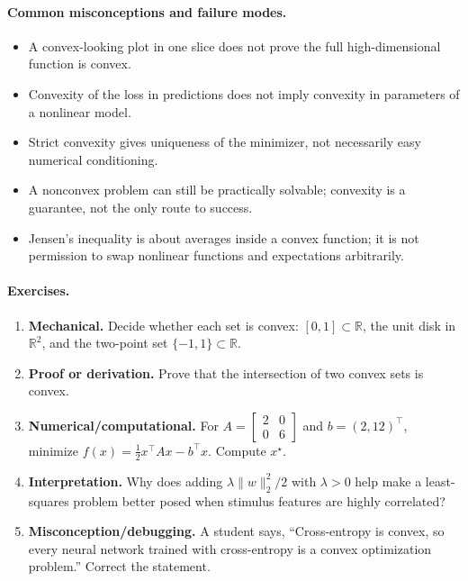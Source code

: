 \paragraph{Common misconceptions and failure modes.}
\begin{itemize}[leftmargin=*]
\item A convex-looking plot in one slice does not prove the full high-dimensional function is convex.
\item Convexity of the loss in predictions does not imply convexity in parameters of a nonlinear model.
\item Strict convexity gives uniqueness of the minimizer, not necessarily easy numerical conditioning.
\item A nonconvex problem can still be practically solvable; convexity is a guarantee, not the only route to success.
\item Jensen's inequality is about averages inside a convex function; it is not permission to swap nonlinear functions and expectations arbitrarily.
\end{itemize}

\paragraph{Exercises.}
\begin{enumerate}[label=\textbf{20.2.\arabic*.}, leftmargin=*]
\item \textbf{Mechanical.} Decide whether each set is convex: \([0,1]\subset\mathbb R\), the unit disk in \(\mathbb R^2\), and the two-point set \(\{-1,1\}\subset\mathbb R\).
\item \textbf{Proof or derivation.} Prove that the intersection of two convex sets is convex.
\item \textbf{Numerical/computational.} For \(A=\begin{bmatrix}2&0\\0&6\end{bmatrix}\) and \(b=(2,12)^\top\), minimize \(f(x)=\frac12x^\top Ax-b^\top x\). Compute \(x^\star\).
\item \textbf{Interpretation.} Why does adding \(\lambda\|w\|_2^2/2\) with \(\lambda>0\) help make a least-squares problem better posed when stimulus features are highly correlated?
\item \textbf{Misconception/debugging.} A student says, ``Cross-entropy is convex, so every neural network trained with cross-entropy is a convex optimization problem.'' Correct the statement.
\end{enumerate}

